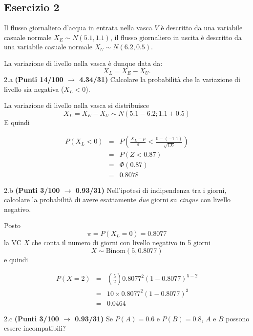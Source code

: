 \documentclass[
  11pt,
]{book}
\theoremstyle{mytheoremstyle}
\theoremstyle{mydefstyle}
\newenvironment{sol}
  {
  \begin{tcolorbox}[enhanced,breakable,arc=0.1mm,boxrule=1pt,colback=white,colframe=iblue,
  title=\bf \fontfamily{lmss}\selectfont \hspace{.5 cm} Soluzione,drop fuzzy shadow]

}{
\end{tcolorbox}
  }
\begin{document}
\subsection{Esercizio 2}\label{esercizio-2-4}

Il flusso giornaliero d'acqua in entrata nella vasca \(V\) è descritto da una variabile casuale normale \(X_E\sim N(5.1,1.1)\), il flusso giornaliero in uscita è descritto da una variabile casuale normale \(X_U\sim N(6.2,0.5)\).

La variazione di livello nella vasca è dunque data da:
\[
X_L=X_E-X_U.
\]
2.a \textbf{(Punti 14/100 \(\rightarrow\) 4.34/31)} Calcolare la probabilità che la variazione di livello sia negativa (\(X_L<0\)).

\begin{sol}
La variazione di livello nella vasca si distribuisce
\[
X_L=X_E-X_U\sim N(5.1-6.2;1.1+0.5)
\]
E quindi

\begin{eqnarray*}
      P( X_L   <   0 ) 
        &=& P\left(  \frac { X_L  -  \mu }{ \sigma }  <  \frac { 0  -  ( -1.1 ) }{\sqrt{ 1.6 }} \right)  \\
                 &=& P\left(  Z   <   0.87 \right) \\    
                 &=&  \Phi( 0.87 ) \\ &=&  0.8078 
      \end{eqnarray*}

\end{sol}

2.b \textbf{(Punti 3/100 \(\rightarrow\) 0.93/31)} Nell'ipotesi di indipendenza tra i giorni, calcolare la probabilità di avere esattamente \emph{due} giorni su \emph{cinque} con livello negativo.

\begin{sol}
Posto
\[
\pi = P(X_L=0)=0.8077
\]
la VC \(X\) che conta il numero di giorni con livello negativo in 5 giorni
\[
X\sim\text{Binom}(5,0.8077)
\]
e quindi

\normalsize 
\begin{eqnarray*}
      P( X = 2 ) &=& \binom{ 5 }{ 2 } 0.8077 ^{ 2 }(1- 0.8077 )^{ 5 - 2 } \\                 &=& 10 \times 0.8077 ^{ 2 }(1- 0.8077 )^{ 3 } \\                 &=& 0.0464 
   \end{eqnarray*}
\normalsize 

\end{sol}

2.c \textbf{(Punti 3/100 \(\rightarrow\) 0.93/31)} Se \(P(A)=0.6\) e \(P(B)=0.8\), \(A\) e \(B\) possono essere incompatibili?
\end{document}
